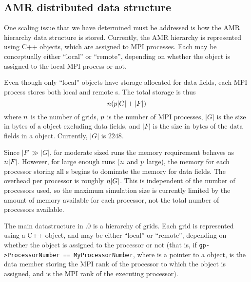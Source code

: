 \documentclass{article}
\begin{document}
\subsection{AMR distributed data structure} \label{issue:amr-distribute}


 One scaling issue that we have determined must be addressed is how
 the AMR hierarchy data structure is stored.  Currently, the AMR
 hierarchy is represented using C++  objects, which are
 assigned to MPI processes.  Each  may be conceptually
 either ``local'' or ``remote'', depending on whether the 
 object is assigned to the local MPI process or not.

 Even though only ``local''  objects have storage allocated
 for data fields, each MPI process stores both local and remote
 s.  The total storage is thus \[ n (p |G|
 + |F|)\] where $n$ is the number of grids, $p$ is the
 number of MPI processes, $|G|$ is the size in bytes of a 
 object excluding data fields, and $|F|$ is the size in bytes of the
 data fields in a  object.  Currently, $|G|$ is $2248$.

 Since $|F| \gg |G|$, for moderate sized runs the memory requirement
 behaves as $n |F|$.  However, for large enough runs
 ($n$ and $p$ large), the memory for each processor
 storing all s begins to dominate the memory for data
 fields.  The overhead per processor is roughly $n |G|$.  This
 is independent of the number of processors used, so the maximum
 simulation size is currently limited by the amount of memory
 available for each processor, not the total number of processors
 available.

The main datastructure in .0 is a hierarchy of grids.  Each
grid is represented using a C++  object, and may be either
``local'' or ``remote'', depending on whether the
 object is assigned to the processor or not (that is, if
\verb+gp->ProcessorNumber == MyProcessorNumber+, where
 is a pointer to a  object, 
is the  data member storing the MPI rank of the processor to
which the  object is assigned, and 
is the MPI rank of the executing processor).
\end{document}
